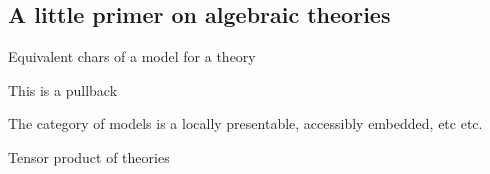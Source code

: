 \documentclass{amsart}
\begin{document}
\subsection{A little primer on algebraic theories}
\begin{definition}
    
\end{definition}
\begin{example}
    
\end{example}
\begin{definition}
    
\end{definition}
\begin{definition}
  
\end{definition}
\begin{proposition}
  Equivalent chars of a model for a theory
\end{proposition}
\begin{corollary}
  This is a pullback
\end{corollary}
\begin{corollary}
  The category of models is a locally presentable, accessibly embedded, etc etc.
\end{corollary}
\begin{definition}
  Tensor product of theories
\end{definition}
\end{document}
